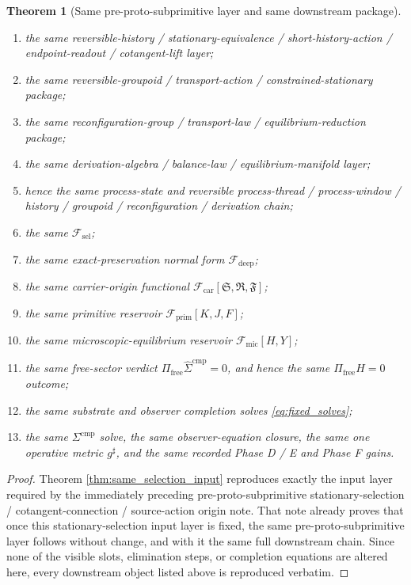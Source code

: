 \documentclass[11pt]{article}
\newcommand{\CompletedMetric}{g^{\sharp}}
\newcommand{\CompLift}{\widehat\Sigma^{\mathrm{cmp}}}
\newcommand{\FreeProj}{\Pi_{\mathrm{free}}}
\newcommand{\GaugeAux}{Y}
\newcommand{\MicFunctional}{\mathscr F_{\mathrm{mic}}}
\newcommand{\PrimFunctional}{\mathscr F_{\mathrm{prim}}}
\newcommand{\CarrierFunctional}{\mathscr F_{\mathrm{car}}}
\newcommand{\DeepFunctional}{\mathscr F_{\mathrm{deep}}}
\newcommand{\StemFunctional}{\mathscr F_{\mathrm{sel}}}
\newcommand{\PrimStrain}{K}
\newcommand{\PrimNeutral}{J}
\newcommand{\PrimFree}{F}
\newcommand{\CarrierSeed}{\mathfrak S}
\newcommand{\RelabelSeed}{\mathfrak R}
\newcommand{\FreeSeed}{\mathfrak F}
\newtheorem{theorem}{Theorem}
\begin{document}
\begin{theorem}[Same pre-proto-subprimitive layer and same downstream package]
\begin{enumerate}
    \item the same reversible-history / stationary-equivalence / short-history-action / endpoint-readout / cotangent-lift layer;
    \item the same reversible-groupoid / transport-action / constrained-stationary package;
    \item the same reconfiguration-group / transport-law / equilibrium-reduction package;
    \item the same derivation-algebra / balance-law / equilibrium-manifold layer;
    \item hence the same process-state and reversible process-thread / process-window / history / groupoid / reconfiguration / derivation chain;
    \item the same \(\StemFunctional\);
    \item the same exact-preservation normal form \(\DeepFunctional\);
    \item the same carrier-origin functional \(\CarrierFunctional[\CarrierSeed,\RelabelSeed,\FreeSeed]\);
    \item the same primitive reservoir \(\PrimFunctional[\PrimStrain,\PrimNeutral,\PrimFree]\);
    \item the same microscopic-equilibrium reservoir \(\MicFunctional[H,\GaugeAux]\);
    \item the same free-sector verdict \(\FreeProj\CompLift=0\), and hence the same \(\Pi_{\mathrm{free}}H=0\) outcome;
    \item the same substrate and observer completion solves \eqref{eq:fixed_solves};
    \item the same \(\Sigma^{\mathrm{cmp}}\) solve, the same observer-equation closure, the same one operative metric \(\CompletedMetric\), and the same recorded Phase D / E and Phase F gains.
\end{enumerate}
\end{theorem}

\begin{proof}
Theorem \ref{thm:same_selection_input} reproduces exactly the input layer required by the immediately preceding pre-proto-subprimitive stationary-selection / cotangent-connection / source-action origin note. That note already proves that once this stationary-selection input layer is fixed, the same pre-proto-subprimitive layer follows without change, and with it the same full downstream chain. Since none of the visible slots, elimination steps, or completion equations are altered here, every downstream object listed above is reproduced verbatim.
\end{proof}
\end{document}
